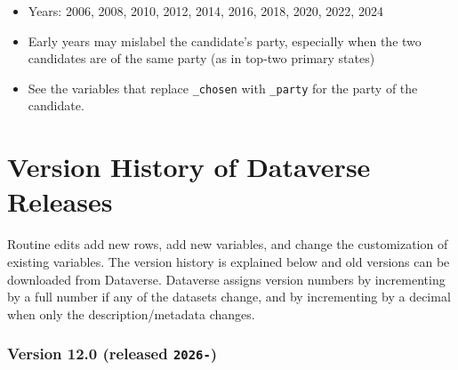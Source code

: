\documentclass[10pt,article,oneside]{memoir}
\begin{document}
\begin{itemize}
\tightlist
\item
  Years: 2006, 2008, 2010, 2012, 2014, 2016, 2018, 2020, 2022, 2024
\item
  Early years may mislabel the candidate's party, especially when the
  two candidates are of the same party (as in top-two primary states)
\item
  See the variables that replace \texttt{\_chosen} with \texttt{\_party}
  for the party of the candidate.
\end{itemize}

\newpage

\section{Version History of Dataverse
Releases}\label{version-history-of-dataverse-releases}

Routine edits add new rows, add new variables, and change the
customization of existing variables. The version history is explained
below and old versions can be downloaded from Dataverse. Dataverse
assigns version numbers by incrementing by a full number if any of the
datasets change, and by incrementing by a decimal when only the
description/metadata changes.

\subsubsection{\texorpdfstring{Version 12.0 (released
\texttt{2026-})}{Version 12.0 (released 2026-)}}\label{version-12.0-released-2026-}
\end{document}
